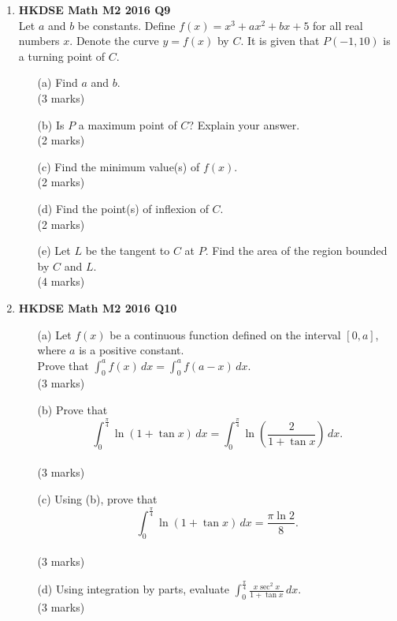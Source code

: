 \documentclass{report}
\begin{document}
\begin{enumerate}
	\item \textbf{HKDSE Math M2 2016 Q9}\\
	Let $a$ and $b$ be constants. Define $f(x) = x^3 + ax^2 + bx + 5$ for all real numbers $x$. Denote the curve $y = f(x)$ by $C$. It is given that $P(-1,10)$ is a turning point of $C$.
	\begin{enumerate}
		\item [(a)]Find $a$ and $b$.\\(3 marks)
		\item [(b)]Is $P$ a maximum point of $C$? Explain your answer. \\(2 marks)
		\item [(c)]Find the minimum value(s) of $f(x)$. \\(2 marks)
		\item [(d)]Find the point(s) of inflexion of $C$. \\(2 marks)
		\item [(e)]Let $L$ be the tangent to $C$ at $P$. Find the area of the region bounded by $C$ and $L$. \\(4 marks)
	\end{enumerate}

	\newpage

	\item \textbf{HKDSE Math M2 2016 Q10}
	\begin{enumerate}
		\item [(a)]Let $f(x)$ be a continuous function defined on the interval $[0,a]$, where $a$ is a positive constant. \\Prove that $\displaystyle\int_0^a f(x)\,dx = \int_0^a f(a-x)\,dx$. \\(3 marks)
		\item [(b)]Prove that $$\displaystyle\int_{0}^{\tfrac{\pi}{4}} \ln{(1+\tan{x})}\,dx = \int_{0}^{\tfrac{\pi}{4}} \ln{\left(\frac{2}{1+\tan{x}}\right)}\,dx.$$ \\(3 marks)
		\item [(c)]Using (b), prove that $$\displaystyle\int_{0}^{\tfrac{\pi}{4}} \ln {(1+\tan{x})}\,dx = \frac{\pi \ln 2}{8}.$$ \\(3 marks)
		\item [(d)]Using integration by parts, evaluate $\displaystyle\int_{ 0}^{\tfrac{\pi}{4}} \frac{x\sec^2{x}}{1+\tan{x}}\,dx$. \\(3 marks)
	\end{enumerate}


\end{enumerate}
\end{document}
